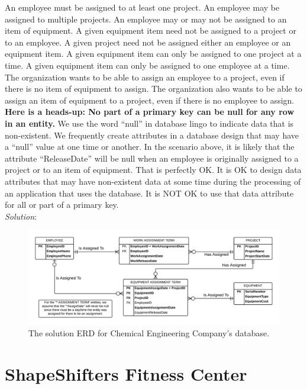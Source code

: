 \documentclass{article}
\begin{document}
An employee must be assigned to at least one project. An employee may be assigned to multiple projects. An employee may or may not be assigned to an item of equipment. A given equipment item need not be assigned to a project or to an employee. A given project need not be assigned either an employee or an equipment item. A given equipment item can only be assigned to one project at a time. A given equipment item can only be assigned to one employee at a time. The organization wants to be able to assign an employee to a project, even if there is no item of equipment to assign. The organization also wants to be able to assign an item of equipment to a project, even if there is no employee to assign.\\

\textbf{Here is a heads-up: No part of a primary key can be null for any row in an entity.} We use the word “null” in database lingo to indicate data that is non-existent. We frequently create attributes in a database design that may have a “null” value at one time or another. In the scenario above, it is likely that the attribute “ReleaseDate” will be null when an employee is originally assigned to a project or to an item of equipment. That is perfectly OK. It is OK to design data attributes that may have non-existent data at some time during the processing of an application that uses the database. It is NOT OK to use that data attribute for all or part of a primary key.\\

\textit{Solution}:

  \begin{figure}[h]
    \centering
    \includegraphics[width=.9\linewidth]{HW02_01-ERD}
    \caption{The solution ERD for Chemical Engineering Company's database.}
    \label{fig:chemeng}
  \end{figure}

\newpage
\section{ShapeShifters Fitness Center}
\end{document}
